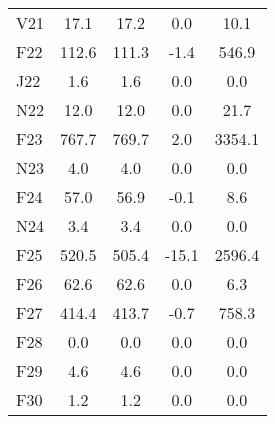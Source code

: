 \documentclass[article,crop=false]{standalone}%
\begin{document}
\begin{tabular}[h]{l | c c c c}
V21&17.1&17.2&0.0&10.1\\%
\rowcolor{white}%
F22&112.6&111.3&{-}1.4&546.9\\%
\rowcolor{lightgray}%
J22&1.6&1.6&0.0&0.0\\%
\rowcolor{white}%
N22&12.0&12.0&0.0&21.7\\%
\rowcolor{lightgray}%
F23&767.7&769.7&2.0&3354.1\\%
\rowcolor{white}%
N23&4.0&4.0&0.0&0.0\\%
\rowcolor{lightgray}%
F24&57.0&56.9&{-}0.1&8.6\\%
\rowcolor{white}%
N24&3.4&3.4&0.0&0.0\\%
\rowcolor{lightgray}%
F25&520.5&505.4&{-}15.1&2596.4\\%
\rowcolor{white}%
F26&62.6&62.6&0.0&6.3\\%
\rowcolor{lightgray}%
F27&414.4&413.7&{-}0.7&758.3\\%
\rowcolor{white}%
F28&0.0&0.0&0.0&0.0\\%
\rowcolor{lightgray}%
F29&4.6&4.6&0.0&0.0\\%
\rowcolor{white}%
F30&1.2&1.2&0.0&0.0\\%
\hline%
\end{tabular}%
\end{document}
